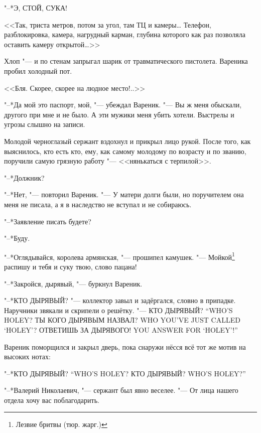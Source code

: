 "--*Э, СТОЙ, СУКА!

<<Так, триста метров, потом за угол, там ТЦ и камеры\ldots{}
Телефон, разблокировка, камера, нагрудный карман, глубина которого как раз позволяла оставить камеру открытой\ldots{}>>

Хлоп "--- и по стенам запрыгал шарик от травматического пистолета.
Вареника пробил холодный пот.

<<Бля.
Скорее, скорее на людное место!..>>

\asterism

"--*Да мой это паспорт, мой, "--- убеждал Вареник.
"--- Вы ж меня обыскали, другого при мне и не было.
А эти мужики меня убить хотели.
Выстрелы и угрозы слышно на записи.

Молодой черноглазый сержант вздохнул и прикрыл лицо рукой.
После того, как выяснилось, кто есть кто, ему, как самому молодому по возрасту и по званию, поручили самую грязную работу "--- <<нянькаться с терпилой>>.

"--*Должник?

"--*Нет, "--- повторил Вареник.
"--- У матери долги были, но поручителем она меня не писала, а я в наследство не вступал и не собираюсь.

"--*Заявление писать будете?

"--*Буду.

\asterism

\textspace

"--*Оглядывайся, королева армянская, "--- прошипел камушек.
"--- Мойкой\footnote{Лезвие бритвы (тюр. жарг.)} распишу и тебя и суку твою, слово пацана!

"--*Закройся, дырявый, "--- буркнул Вареник.

"--*КТО ДЫРЯВЫЙ? "--- коллектор завыл и задёргался, словно в припадке.
Наручники звякали и скрипели о решётку.
{"--- КТО ДЫРЯВЫЙ?}
{``WHO'S HOLEY?}
{ТЫ КОГО ДЫРЯВЫМ НАЗВАЛ?}
{WHO YOU'VE JUST CALLED `HOLEY'?}
{ОТВЕТИШЬ ЗА ДЫРЯВОГО!}
{YOU ANSWER FOR `HOLEY'!''}

\textspace

Вареник поморщился и закрыл дверь, пока снаружи нёсся всё тот же мотив на высоких нотах:

{"--*КТО ДЫРЯВЫЙ?}
{``WHO'S HOLEY?}
{КТО ДЫРЯВЫЙ?}
{WHO'S HOLEY?''}

\asterism

\textspace

"--*Валерий Николаевич, "--- сержант был явно веселее.
"--- От лица нашего отдела хочу вас поблагодарить.

